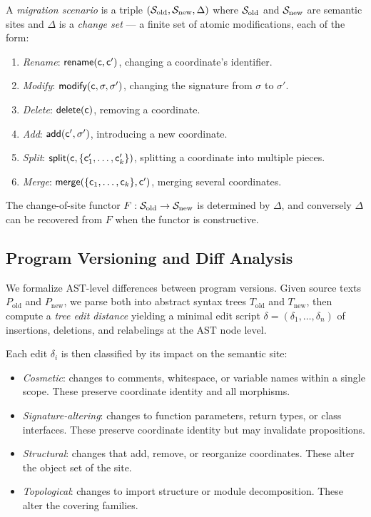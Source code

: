 \documentclass[11pt]{article}
\newcommand{\SiteOld}{\Site_{\mathrm{old}}}
\newcommand{\SiteNew}{\Site_{\mathrm{new}}}
\newcommand{\FunctorF}{F}
\begin{document}
\begin{definition}\label{def:migration-scenario}
A \emph{migration scenario} is a triple $(\SiteOld, \SiteNew, \Delta)$
where $\SiteOld$ and $\SiteNew$ are semantic sites and $\Delta$ is a
\emph{change set} --- a finite set of atomic modifications, each of the
form:
\begin{enumerate}[noitemsep]
  \item \emph{Rename}: $\mathsf{rename}(\mathsf{c}, \mathsf{c}')$, changing a
        coordinate's identifier.
  \item \emph{Modify}: $\mathsf{modify}(\mathsf{c}, \sigma, \sigma')$,
        changing the signature from $\sigma$ to $\sigma'$.
  \item \emph{Delete}: $\mathsf{delete}(\mathsf{c})$, removing a coordinate.
  \item \emph{Add}: $\mathsf{add}(\mathsf{c}', \sigma')$, introducing a new
        coordinate.
  \item \emph{Split}: $\mathsf{split}(\mathsf{c}, \{\mathsf{c}_1', \ldots,
        \mathsf{c}_k'\})$, splitting a coordinate into multiple pieces.
  \item \emph{Merge}: $\mathsf{merge}(\{\mathsf{c}_1, \ldots, \mathsf{c}_k\},
        \mathsf{c}')$, merging several coordinates.
\end{enumerate}
The change-of-site functor $\FunctorF : \SiteOld \to \SiteNew$ is
determined by $\Delta$, and conversely $\Delta$ can be recovered from
$\FunctorF$ when the functor is constructive.
\end{definition}

\subsection{Program Versioning and Diff Analysis}\label{sec:diff-analysis}

We formalize AST-level differences between program versions.  Given source
texts $P_{\mathrm{old}}$ and $P_{\mathrm{new}}$, we parse both into
abstract syntax trees $T_{\mathrm{old}}$ and $T_{\mathrm{new}}$, then
compute a \emph{tree edit distance} yielding a minimal edit script
$\delta = (\delta_1, \ldots, \delta_n)$ of insertions, deletions, and
relabelings at the AST node level.

Each edit $\delta_i$ is then classified by its impact on the semantic site:
\begin{itemize}[noitemsep]
  \item \emph{Cosmetic}: changes to comments, whitespace, or variable names
        within a single scope.  These preserve coordinate identity and all
        morphisms.
  \item \emph{Signature-altering}: changes to function parameters, return
        types, or class interfaces.  These preserve coordinate identity but
        may invalidate propositions.
  \item \emph{Structural}: changes that add, remove, or reorganize
        coordinates.  These alter the object set of the site.
  \item \emph{Topological}: changes to import structure or module
        decomposition.  These alter the covering families.
\end{itemize}
\end{document}
